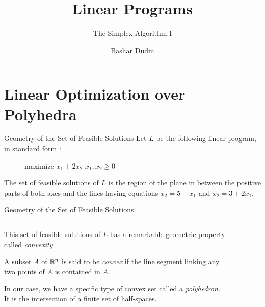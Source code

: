 \documentclass[aspectratio = 169]{beamer}
\author[BD]{Bashar Dudin}
\institute[]{EPITA}
\title{Linear Programs} %
\subtitle{The Simplex Algorithm I}
\begin{document}
\begin{frame}[plain]
\titlepage %
\end{frame}

\section{Linear Optimization over Polyhedra}

\begin{frame}{Geometry of the Set of Feasible Solutions}
    Let $L$ be the following linear program, in standard form :
    \begin{figure}
        \begin{linearProg}{
            maximize
            }{
            $x_1 + 2x_2$
            }{
            }{
            $x_1, x_2 \geq 0$
            }
        \end{linearProg}
    \end{figure}

    The set of feasible solutions of $L$ is the region of the plane in
    between the positive parts of both axes and the lines having
    equations $x_2 = 5 - x_1$ and $x_2 = 3 + 2x_1$.
\end{frame}

\begin{frame}{Geometry of the Set of Feasible Solutions}
  \begin{columns}
    \begin{column}{.4\textwidth}
      This set of feasible solutions of $L$ has a remarkable geometric
      property called \textit{convexity}.
      \begin{defn}
        A subset $A$ of $\mathbb{R}^n$ is said to be \emph{convex} if the
        line segment linking any two points of $A$ is contained in
        $A$.
      \end{defn}
      In our case, we have a specific type of convex set called a
      \emph{polyhedron}. It is the intersection of a finite set of
      half-spaces.
    \end{column}
    \begin{column}{.6\textwidth}
      \begin{figure}
      \end{figure}
    \end{column}
  \end{columns}
\end{frame}
\end{document}
